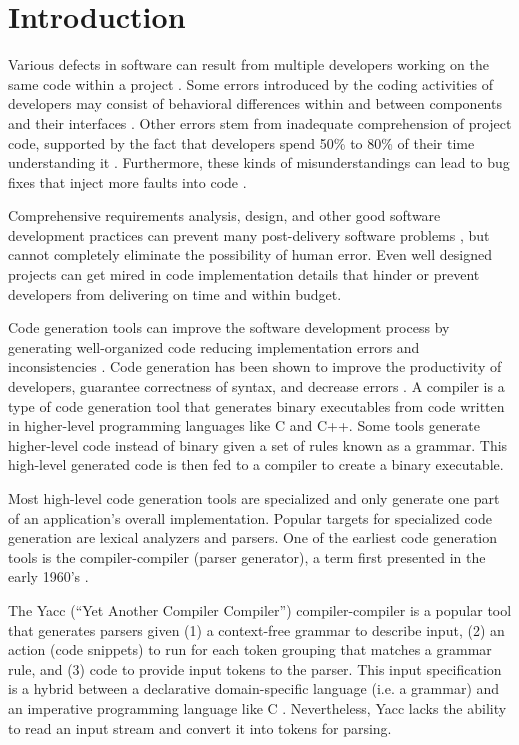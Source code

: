 \chapter{Introduction}
Various defects in software can result from multiple developers working on the same code within a project \cite{livshits_01}.  Some errors introduced by the coding activities of developers may consist of behavioral differences within and between components and their interfaces \cite{leveson_01,smidts_01,nakajo_01}.  Other errors stem from inadequate comprehension of project code, supported by the fact that developers spend 50\% to 80\% of their time understanding it \cite{sinha_01}.  Furthermore, these kinds of misunderstandings can lead to bug fixes that inject more faults into code \cite{smidts_01}.

\indent
Comprehensive requirements analysis, design, and other good software development practices can prevent many post-delivery software problems \cite{boehm_01}, but cannot completely eliminate the possibility of human error.  Even well designed projects can get mired in code implementation details that hinder or prevent developers from delivering on time and within budget.

\indent
Code generation tools can improve the software development process by generating well-organized code reducing implementation errors and inconsistencies \cite{boysen_01}.  Code generation has been shown to improve the productivity of developers, guarantee correctness of syntax, and decrease errors \cite{groher_01}.  A compiler is a type of code generation tool that generates binary executables from code written in higher-level programming languages like C and C++.   Some tools generate higher-level code instead of binary given a set of rules known as a grammar.  This high-level generated code is then fed to a compiler to create a binary executable.

\indent
Most high-level code generation tools are specialized and only generate one part of an application’s overall implementation.  Popular targets for specialized code generation are lexical analyzers and parsers.  One of the earliest code generation tools is the compiler-compiler (parser generator), a term first presented in the early 1960’s \cite{brooker_01}.

\indent
The Yacc (“Yet Another Compiler Compiler”) \cite{johnson_01} compiler-compiler is a popular tool that generates parsers given (1) a context-free grammar to describe input, (2) an action (code snippets) to run for each token grouping that matches a grammar rule, and (3) code to provide input tokens to the parser.  This input specification is a hybrid between a declarative domain-specific language (i.e. a grammar) and an imperative programming language like C \cite{demetrescu_01,lloyd_01,gifford_01}.  Nevertheless, Yacc lacks the ability to read an input stream and convert it into tokens for parsing.

